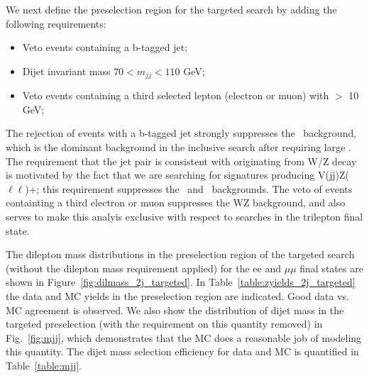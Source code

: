 \clearpage

We next define the preselection region for the targeted search by adding the following requirements:
\begin{itemize}
\item Veto events containing a b-tagged jet;
\item Dijet invariant mass $70<m_{jj}<110$ GeV;
\item Veto events containing a third selected lepton (electron or muon) with \pt $>$ 10 GeV; 
\end{itemize}

The rejection of events with a b-tagged jet strongly suppresses the \ttbar\ background, which is the dominant background in the inclusive search
after requiring large \MET. The requirement that the jet pair is consistent with originating from W/Z decay is motivated by the fact that we are 
searching for signatures producing V(jj)Z($\ell\ell$)+\MET; this requirement suppresses the \zjets\ and \ttbar\ backgrounds. The veto of events
containting a third electron or muon suppresses the WZ background, and also serves to make this analyis exclusive with respect to searches in
the trilepton final state.

The dilepton mass distributions in the preselection region of the targeted search (without the dilepton mass requirement applied) 
for the ee and $\mu\mu$ final states are shown in Figure~\ref{fig:dilmass_2j_targeted}. In Table~\ref{table:zyields_2j_targeted} 
the data and MC yields in the preselection region are indicated. Good data vs. MC agreement is observed.
We also show the distribution of dijet mass in the targeted preselection (with the requirement on this quantity removed) in Fig.~\ref{fig:mjj},
which demonstrates that the MC does a reasonable job of modeling this quantity. The dijet mass selection efficiency for data and MC
is quantified in Table~\ref{table:mjj}.


